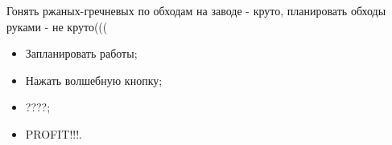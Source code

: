 
Гонять ржаных-гречневых по обходам на заводе - круто, планировать обходы руками - не круто(((
 

\begin{itemize}
	\item Запланировать работы;
	\item Нажать волшебную кнопку;
	\item ????;
	\item PROFIT!!!.
\end{itemize}

\clearpage
